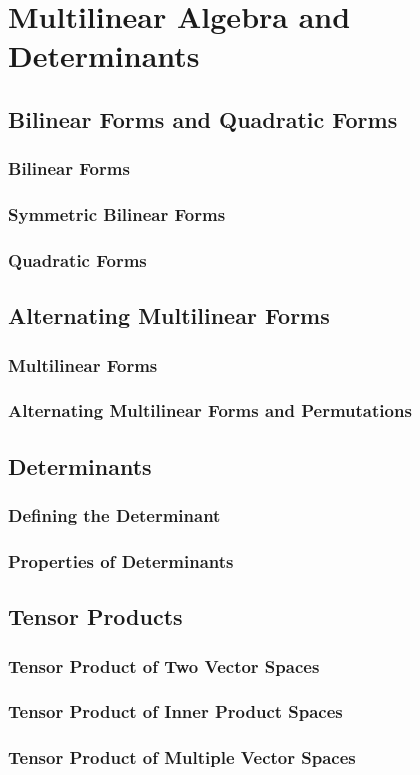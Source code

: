 \chapter{Multilinear Algebra and Determinants}
\section{Bilinear Forms and Quadratic Forms}
\subsection{Bilinear Forms}
\subsection{Symmetric Bilinear Forms}
\subsection{Quadratic Forms}

\section{Alternating Multilinear Forms}
\subsection{Multilinear Forms}
\subsection{Alternating Multilinear Forms and Permutations}

\section{Determinants}
\subsection{Defining the Determinant}
\subsection{Properties of Determinants}

\section{Tensor Products}
\subsection{Tensor Product of Two Vector Spaces}
\subsection{Tensor Product of Inner Product Spaces}
\subsection{Tensor Product of Multiple Vector Spaces}
